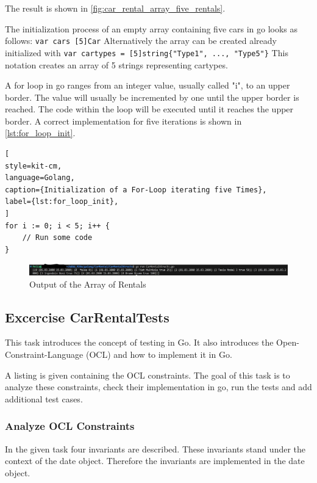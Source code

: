 The result is shown in \autoref{fig:car_rental_array_five_rentals}.

The initialization process of an empty array containing five cars in go looks as follows: \texttt{var cars [5]Car}
Alternatively the array can be created already initialized with \texttt{var cartypes = [5]string\{"Type1", ..., "Type5"\}}
This notation creates an array of 5 strings representing cartypes.

A for loop in go ranges from an integer value, usually called "i", to an upper border.
The value will usually be incremented by one until the upper border is reached. 
The code within the loop will be executed until it reaches the upper border.
A correct implementation for five iterations is shown in \autoref{lst:for_loop_init}.

\begin{lstlisting}[
style=kit-cm,
language=Golang,
caption={Initialization of a For-Loop iterating five Times},
label={lst:for_loop_init},
]
for i := 0; i < 5; i++ {
    // Run some code
}
\end{lstlisting}

\begin{figure}[H]
\centering
\includegraphics[width=\textwidth]{figures/goLang/carRental/carRental_arrayFiveRentals.png}
\caption{Output of the Array of Rentals}
\label{fig:car_rental_array_five_rentals}
\end{figure}

\subsection{Excercise CarRentalTests}
\label{sec:car_rental_tests}
This task introduces the concept of testing in Go.
It also introduces the Open-Constraint-Language (OCL) and how to implement it in Go.

A listing is given containing the OCL constraints.
The goal of this task is to analyze these constraints, check their implementation in go, run the tests and add additional test cases.

\subsubsection*{Analyze OCL Constraints}
In the given task four invariants are described.
These invariants stand under the context of the date object.
Therefore the invariants are implemented in the date object.

